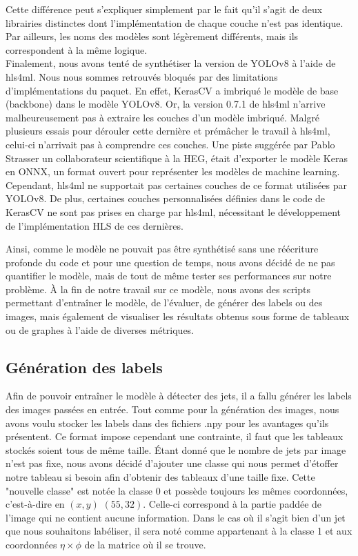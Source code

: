Cette différence peut s'expliquer simplement par le fait qu'il s'agit de deux librairies distinctes dont l'implémentation de chaque couche n'est pas identique. Par ailleurs, les noms des modèles sont légèrement différents, mais ils correspondent à la même logique.\\

Finalement, nous avons tenté de synthétiser la version de YOLOv8 à l'aide de \acrshort{hls4ml}. Nous nous sommes retrouvés bloqués par des limitations d'implémentations du paquet. En effet, KerasCV a imbriqué le modèle de base (backbone) dans le modèle YOLOv8. Or, la version 0.7.1 de \acrshort{hls4ml} n'arrive malheureusement pas à extraire les couches d'un modèle imbriqué. Malgré plusieurs essais pour dérouler cette dernière et prémâcher le travail à \acrshort{hls4ml}, celui-ci n'arrivait pas à comprendre ces couches. Une piste suggérée par Pablo Strasser un collaborateur scientifique à la HEG, était d'exporter le modèle Keras en ONNX, un format ouvert pour représenter les modèles de machine learning. Cependant, \acrshort{hls4ml} ne supportait pas certaines couches de ce format utilisées par YOLOv8. De plus, certaines couches personnalisées définies dans le code de KerasCV ne sont pas prises en charge par \acrshort{hls4ml}, nécessitant le développement de l'implémentation HLS de ces dernières.

Ainsi, comme le modèle ne pouvait pas être synthétisé sans une réécriture profonde du code et pour une question de temps, nous avons décidé de ne pas quantifier le modèle, mais de tout de même tester ses performances sur notre problème. À la fin de notre travail sur ce modèle, nous avons des scripts permettant d'entraîner le modèle, de l'évaluer, de générer des labels ou des images, mais également de visualiser les résultats obtenus sous forme de tableaux ou de graphes à l'aide de diverses métriques.

\subsection{Génération des labels}
\label{subsec:yolov8_labels_generation}

Afin de pouvoir entraîner le modèle à détecter des jets, il a fallu générer les labels des images passées en entrée. Tout comme pour la génération des images, nous avons voulu stocker les labels dans des fichiers .npy pour les avantages qu'ils présentent. Ce format impose cependant une contrainte, il faut que les tableaux stockés soient tous de même taille. Étant donné que le nombre de jets par image n'est pas fixe, nous avons décidé d'ajouter une classe qui nous permet d'étoffer notre tableau si besoin afin d'obtenir des tableaux d'une taille fixe. Cette "nouvelle classe" est notée la classe 0 et possède toujours les mêmes coordonnées, c'est-à-dire en $(x, y)$  $(55, 32)$. Celle-ci correspond à la partie paddée de l'image qui ne contient aucune information. Dans le cas où il s'agit bien d'un jet que nous souhaitons labéliser, il sera noté comme appartenant à la classe 1 et aux coordonnées $\eta \times \phi$ de la matrice où il se trouve.

